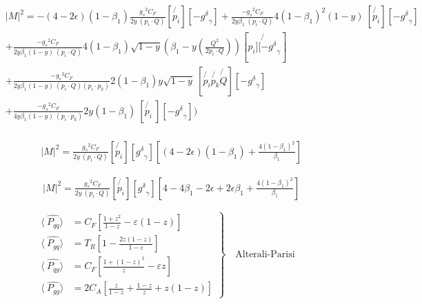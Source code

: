 \begin{equation}
\begin{split}
&|M|^2=-(4-2\epsilon)(1-\beta_1)\frac{{g_s}^2 C_F}{2y \:(p_i \cdot Q)}
[  \not{p_i}][-{g^{\delta}}_{\gamma}]+\frac{-{g_s}^2 C_F}{2y\beta_1 \:(p_i \cdot Q)}4(1-\beta_1)^2 (1-y)\:[\not{p_i}][-{g^{\delta}}_{\gamma}]\:\\
&+\frac{-{g_s}^2 C_F}{2y\beta_1 (1-y)\:(p_i \cdot Q)} 4(1-\beta_1)\sqrt{1-y}(\beta_1 - y(\frac{Q^2}{2p_i \cdot Q}))[\not{p_i][-{g^{\delta}}_{\gamma}}]\\
&+\frac{-{g_s}^2 C_F}{2y\beta_1 (1-y)\:(p_i \cdot Q)(p_i \cdot p_k)} 2(1-\beta_1)y\sqrt{1-y}\:[\not{p_i}\not{p_k}\not{Q}][-{g^{\delta}}_{\gamma}]\\
&+\frac{-{g_s}^2 C_F}{4y\beta_1 (1-y)\:(p_i \cdot p_k)}2y(1-\beta_1)\:[\not{p_i}\:][-{g^{\delta}}_{\gamma}])\\
\end{split}
\end{equation}


\begin{equation}
\begin{split}
&|M|^2=\frac{{g_s}^2 C_F}{2y \:(p_i \cdot Q)}
[  \not{p_i}][{g^{\delta}}_{\gamma}][(4-2\epsilon)(1-\beta_1)+\frac{4(1-\beta_1)^2}{\beta_1}]
\end{split}
\end{equation}

\begin{equation}
\begin{split}
&|M|^2=\frac{{g_s}^2 C_F}{2y \:(p_i \cdot Q)}
[  \not{p_i}][{g^{\delta}}_{\gamma}][4-4\beta_1-2\epsilon +2\epsilon\beta_1+\frac{4(1-\beta_1)^2}{\beta_1}]
\end{split}
\end{equation}

\begin{equation}
	\left.\begin{aligned}
\langle\:\hat{P_{qq}}\rangle &= C_F[\frac{1+z^2}{1-z}-\varepsilon(1-z)]\\
\langle\:\hat{P_{gq}}\rangle &= T_R[1-\frac{2z(1-z)}{1-\varepsilon}]\\
\langle\:\hat{P_{qg}}\rangle &= C_F[\frac{1+(1-z)^2}{z}-\varepsilon z]\\
\langle\:\hat{P_{gg}}\rangle &= 2C_A[\frac{z}{1-z}+\frac{1-z}{z}+z(1-z)]
\end{aligned}
	\right\}
	\quad \text{Alterali-Parisi
	}
\label{Alterali-Parisi}
\end{equation}